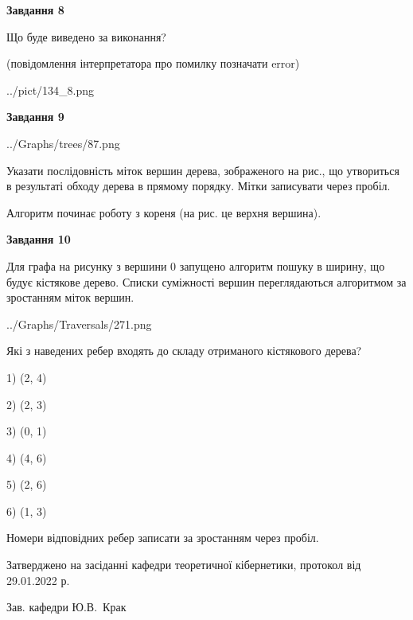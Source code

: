 \documentclass[12pt, ukrainian]{article}
\begin{document}
{\begin {large}
{\begin {center}\textbf{Завдання 8}\end {center}}\par
Що буде виведено за виконання?\par
 (повідомлення інтерпретатора про помилку позначати error)\par
\begin{center}
	{../pict/134_8.png}
\end{center}
\newpage

{\begin {center}\textbf{Завдання 9}\end {center}}\par

\begin{center}
	{../Graphs/trees/87.png}
\end{center}
Указати послідовність міток вершин дерева, зображеного на рис., що утвориться в результаті обходу дерева в прямому порядку. Мітки записувати через пробіл.\par Алгоритм починає роботу з кореня (на рис. це верхня вершина).\par
\newpage

{\begin {center}\textbf{Завдання 10}\end {center}}\par
Для графа на рисунку з вершини 0 запущено алгоритм пошуку в ширину, що будує кістякове дерево. Списки суміжності вершин переглядаються алгоритмом за зростанням міток вершин.\par
\begin{center}
	{../Graphs/Traversals/271.png}
\end{center}
\par Які з наведених ребер входять до складу отриманого кістякового дерева?\par
1) (2, 4)\par
2) (2, 3)\par
3) (0, 1)\par
4) (4, 6)\par
5) (2, 6)\par
6) (1, 3)\par
{\vskip 15pt} Номери відповідних ребер записати за зростанням через пробіл.\par
\newpage


\end {large}
}
{\smallskip \begin {small} Затверджено на засіданні кафедри теоретичної кібернетики, протокол  від   29.01.2022 р.\par\smallskip\smallskip
{\parbox {6.5 cm}{Зав. кафедри \dotfill Ю.В.~Крак}} \end{small}}
\end{document}
